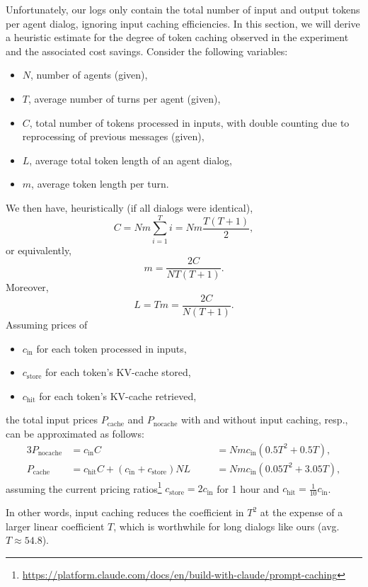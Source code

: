 \documentclass[]{fairmeta}
\begin{document}
Unfortunately, our logs only contain the total number of input and output tokens per agent dialog, ignoring input caching efficiencies. In this section, we will derive a heuristic estimate for the degree of token caching observed in the experiment and the associated cost savings. Consider the following variables:
\begin{itemize}
\item $N$, number of agents (given),
\item $T$, average number of turns per agent (given),
\item $C$, total number of tokens processed in inputs, with double counting due to reprocessing of previous messages (given),
\item $L$, average total token length of an agent dialog,
\item $m$, average token length per turn.
\end{itemize}
We then have, heuristically (if all dialogs were identical),
\[
C = Nm \sum_{i=1}^T i = Nm \frac{T(T+1)}{2},
\]
or equivalently,
\[
m = \frac{2C}{NT(T+1)}.
\]
Moreover,
\[
L = Tm = \frac{2C}{N(T+1)}.
\]
Assuming prices of
\begin{itemize}
\item $c_{\text{in}}$ for each token processed in inputs,
\item $c_{\text{store}}$ for each token's KV-cache stored,
\item $c_{\text{hit}}$ for each token's KV-cache retrieved,
\end{itemize}
the total input prices $P_{\text{cache}}$ and $P_{\text{nocache}}$ with and without input caching, resp., can be approximated as follows:
\begin{alignat*}{3}
P_{\text{nocache}} &= c_{\text{in}} C
&\quad &= Nmc_{\text{in}}\left(0.5T^2 + 0.5T\right), \\
P_{\text{cache}}   &= c_{\text{hit}} C + (c_{\text{in}} + c_{\text{store}}) NL
&\quad &= Nm c_{\text{in}}\left(0.05T^2 + 3.05T\right),
\end{alignat*}
assuming the current pricing ratios\footnote{\url{https://platform.claude.com/docs/en/build-with-claude/prompt-caching}} $c_{\text{store}} = 2c_{\text{in}}$ for 1 hour and $c_{\text{hit}} = \frac{1}{10} c_{\text{in}}$.

In other words, input caching reduces the coefficient in $T^2$ at the expense of a larger linear coefficient $T$, which is worthwhile for long dialogs like ours (avg. $T \approx 54.8$).
\end{document}
